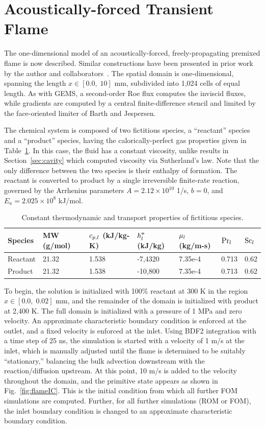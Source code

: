 \section{Acoustically-forced Transient Flame}\label{sec:oneDFlame}

The one-dimensional model of an acoustically-forced, freely-propagating premixed flame is now described. Similar constructions have been presented in prior work by the author and collaborators~\cite{Huang2022,Wentland2019}. The spatial domain is one-dimensional, spanning the length $x \in [0.0, \; 10]$ mm, subdivided into 1,024 cells of equal length. As with GEMS, a second-order Roe flux computes the inviscid fluxes, while gradients are computed by a central finite-difference stencil and limited by the face-oriented limiter of Barth and Jespersen.

The chemical system is composed of two fictitious species, a ``reactant'' species and a ``product'' species, having the calorically-perfect gas properties given in Table~\ref{tab:oneDFlameSpecs}. In this case, the fluid has a constant viscosity, unlike results in Section~\ref{sec:cavity} which computed viscosity via Sutherland's law. Note that the only difference between the two species is their enthalpy of formation. The reactant is converted to product by a single irreversible finite-rate reaction, governed by the Arrhenius parameters $A = 2.12 \times 10^{10}$ 1/s, $b = 0$, and $E_a = 2.025 \times 10^{8}$ kJ/mol.

\begin{table}
	\centering
	\begin{tabular}{ lllllll }
	\toprule
	Species & MW (g/mol) & $c_{p,l}$ (kJ/kg-K) & $h^{\circ\kern-0.47em-}_{l}$ (kJ/kg) & $\mu_{l}$ (kg/m-s) & $\text{Pr}_{l}$ & $\text{Sc}_{l}$   \\
	\midrule
	Reactant & 21.32 & 1.538 & -7,4320 & 7.35e-4 & 0.713 & 0.62 \\
	Product & 21.32 & 1.538 & -10,800 & 7.35e-4 & 0.713 & 0.62 \\
	\bottomrule
	\end{tabular}
	\caption{\label{tab:oneDFlameSpecs}Constant thermodynamic and transport properties of fictitious species.}
\end{table}

To begin, the solution is initialized with 100\% reactant at 300 K in the region $x \in [0.0, \; 0.02]$ mm, and the remainder of the domain is initialized with product at 2,400 K. The full domain is initialized with a pressure of 1 MPa and zero velocity. An approximate characteristic boundary condition is enforced at the outlet, and a fixed velocity is enforced at the inlet. Using BDF2 integration with a time step of 25 ns, the simulation is started with a velocity of 1 m/s at the inlet, which is manually adjusted until the flame is determined to be suitably ``stationary,'' balancing the bulk advection downstream with the reaction/diffusion upstream. At this point, 10 m/s is added to the velocity throughout the domain, and the primitive state appears as shown in Fig.~\ref{fig:flameIC}. This is the initial condition from which all further FOM simulations are computed. Further, for all further simulations (ROM or FOM), the inlet boundary condition is changed to an approximate characteristic boundary condition.


